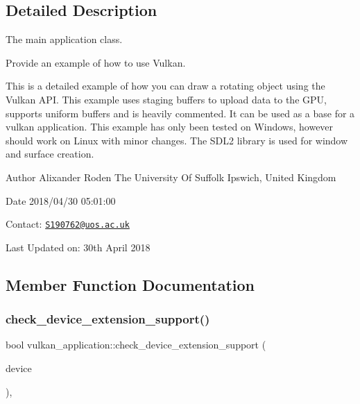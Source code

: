 \subsection{Detailed Description}
The main application class. 

Provide an example of how to use Vulkan.

This is a detailed example of how you can draw a rotating object using the Vulkan A\+PI. This example uses staging buffers to upload data to the G\+PU, supports uniform buffers and is heavily commented. It can be used as a base for a vulkan application. This example has only been tested on Windows, however should work on Linux with minor changes. The S\+D\+L2 library is used for window and surface creation.

\begin{DoxyAuthor}{Author}
Alixander Roden The University Of Suffolk Ipswich, United Kingdom
\end{DoxyAuthor}
\begin{DoxyDate}{Date}
2018/04/30 05\+:01\+:00
\end{DoxyDate}
Contact\+: \href{mailto:S190762@uos.ac.uk}{\tt S190762@uos.\+ac.\+uk}

Last Updated on\+: 30th April 2018 

\subsection{Member Function Documentation}
\mbox{\label{classvulkan__application_a00607f561b3ff3cf7ec587dd0f539731}} 
\subsubsection{\texorpdfstring{check\+\_\+device\+\_\+extension\+\_\+support()}{check\_device\_extension\_support()}}
{\footnotesize\ttfamily bool vulkan\+\_\+application\+::check\+\_\+device\+\_\+extension\+\_\+support (\begin{DoxyParamCaption}\item[{const Vk\+Physical\+Device}]{device }\end{DoxyParamCaption})\hspace{0.3cm}{\ttfamily [static]}, {\ttfamily [private]}}



